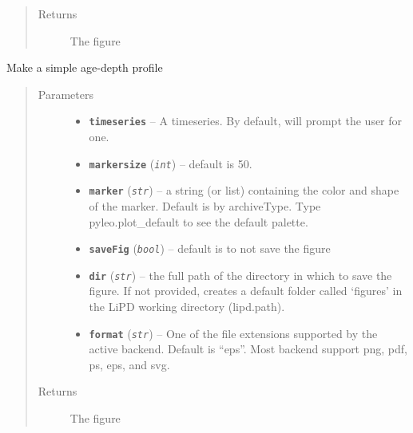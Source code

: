 \documentclass[letterpaper,10pt,english]{sphinxmanual}
\begin{document}
\begin{fulllineitems}
\begin{fulllineitems}
\begin{quote}
\begin{description}
\item[{Returns}] \leavevmode
The figure

\end{description}\end{quote}

\end{fulllineitems}


\begin{fulllineitems}
\label{TSPlots:pyleoclim.Plot.plot_agemodel}
Make a simple age-depth profile
\begin{quote}\begin{description}
\item[{Parameters}] \leavevmode\begin{itemize}
\item {} 
\textbf{\texttt{timeseries}} -- A timeseries. By default, will prompt the user for one.

\item {} 
\textbf{\texttt{markersize}} (\emph{\texttt{int}}) -- default is 50.

\item {} 
\textbf{\texttt{marker}} (\emph{\texttt{str}}) -- a string (or list) containing the color and shape of
the marker. Default is by archiveType. Type pyleo.plot\_default
to see the default palette.

\item {} 
\textbf{\texttt{saveFig}} (\emph{\texttt{bool}}) -- default is to not save the figure

\item {} 
\textbf{\texttt{dir}} (\emph{\texttt{str}}) -- the full path of the directory in which to save the figure.
If not provided, creates a default folder called `figures' in
the LiPD working directory (lipd.path).

\item {} 
\textbf{\texttt{format}} (\emph{\texttt{str}}) -- One of the file extensions supported by the active
backend. Default is ``eps''. Most backend support png, pdf, ps,
eps, and svg.

\end{itemize}

\item[{Returns}] \leavevmode
The figure

\end{description}\end{quote}

\end{fulllineitems}


\end{fulllineitems}
\end{document}
